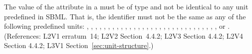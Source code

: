 The value of the  attribute in a \UnitDefinition must be of
type  and not be
identical to any unit predefined in SBML.  That is, the identifier
must not be the same as any of the following predefined units:
,
,
,
,
,
,
,
,
,
,
,
,
,
,
,
,
,
,
,
,
,
,
,
,
,
,
,
,
,
,
, or
.
(References: L2V1 erratum~14; L2V2 Section~4.4.2; L2V3 Section 4.4.2;
 L2V4 Section 4.4.2; L3V1 Section~\ref{sec:unit-structure}.)
